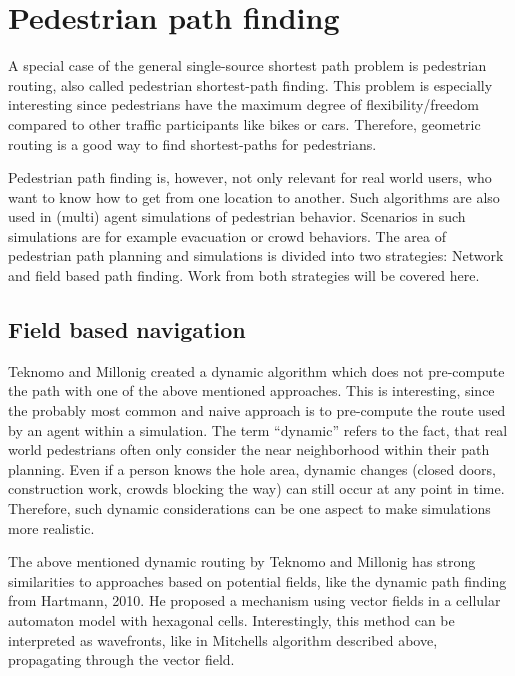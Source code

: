 
\section{Pedestrian path finding}
	
	A special case of the general single-source shortest path problem is pedestrian routing, also called pedestrian shortest-path finding.
	This problem is especially interesting since pedestrians have the maximum degree of flexibility/freedom compared to other traffic participants like bikes or cars.
	Therefore, geometric routing is a good way to find shortest-paths for pedestrians.
	
	Pedestrian path finding is, however, not only relevant for real world users, who want to know how to get from one location to another.
	Such algorithms are also used in (multi) agent simulations of pedestrian behavior.
	Scenarios in such simulations are for example evacuation or crowd behaviors.
	The area of pedestrian path planning and simulations is divided into two strategies: Network and field based path finding\cite[2]{hartmann-geodesic}.
	Work from both strategies will be covered here.
	
	\subsection{Field based navigation}
		
		Teknomo and Millonig created a dynamic algorithm which does not pre-compute the path with one of the above mentioned approaches\cite{teknomo-millonig-routing}.
		This is interesting, since the probably most common and naive approach is to pre-compute the route used by an agent within a simulation.
		The term \enquote{dynamic} refers to the fact, that real world pedestrians often only consider the near neighborhood within their path planning.
		Even if a person knows the hole area, dynamic changes (closed doors, construction work, crowds blocking the way) can still occur at any point in time.
		Therefore, such dynamic considerations can be one aspect to make simulations more realistic.
		
		The above mentioned dynamic routing by Teknomo and Millonig has strong similarities to approaches based on potential fields, like the dynamic path finding from Hartmann, 2010\cite{hartmann-geodesic}.
		He proposed a mechanism using vector fields in a cellular automaton model with hexagonal cells.
		Interestingly, this method can be interpreted as wavefronts, like in Mitchells algorithm described above, propagating through the vector field\cite[4]{hartmann-geodesic}.
			
